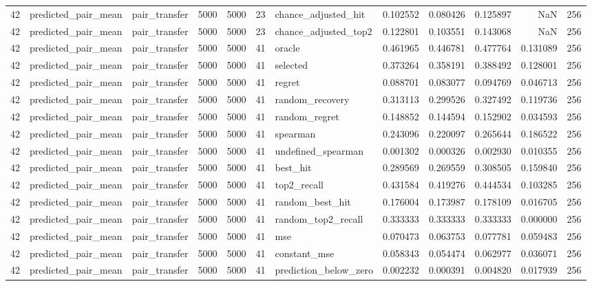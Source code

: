 \begin{tabular}{rllrrrlrrrrr}
42 & predicted_pair_mean & pair_transfer & 5000 & 5000 & 23 & chance_adjusted_hit & 0.102552 & 0.080426 & 0.125897 & NaN & 256 \\
42 & predicted_pair_mean & pair_transfer & 5000 & 5000 & 23 & chance_adjusted_top2 & 0.122801 & 0.103551 & 0.143068 & NaN & 256 \\
42 & predicted_pair_mean & pair_transfer & 5000 & 5000 & 41 & oracle & 0.461965 & 0.446781 & 0.477764 & 0.131089 & 256 \\
42 & predicted_pair_mean & pair_transfer & 5000 & 5000 & 41 & selected & 0.373264 & 0.358191 & 0.388492 & 0.128001 & 256 \\
42 & predicted_pair_mean & pair_transfer & 5000 & 5000 & 41 & regret & 0.088701 & 0.083077 & 0.094769 & 0.046713 & 256 \\
42 & predicted_pair_mean & pair_transfer & 5000 & 5000 & 41 & random_recovery & 0.313113 & 0.299526 & 0.327492 & 0.119736 & 256 \\
42 & predicted_pair_mean & pair_transfer & 5000 & 5000 & 41 & random_regret & 0.148852 & 0.144594 & 0.152902 & 0.034593 & 256 \\
42 & predicted_pair_mean & pair_transfer & 5000 & 5000 & 41 & spearman & 0.243096 & 0.220097 & 0.265644 & 0.186522 & 256 \\
42 & predicted_pair_mean & pair_transfer & 5000 & 5000 & 41 & undefined_spearman & 0.001302 & 0.000326 & 0.002930 & 0.010355 & 256 \\
42 & predicted_pair_mean & pair_transfer & 5000 & 5000 & 41 & best_hit & 0.289569 & 0.269559 & 0.308505 & 0.159840 & 256 \\
42 & predicted_pair_mean & pair_transfer & 5000 & 5000 & 41 & top2_recall & 0.431584 & 0.419276 & 0.444534 & 0.103285 & 256 \\
42 & predicted_pair_mean & pair_transfer & 5000 & 5000 & 41 & random_best_hit & 0.176004 & 0.173987 & 0.178109 & 0.016705 & 256 \\
42 & predicted_pair_mean & pair_transfer & 5000 & 5000 & 41 & random_top2_recall & 0.333333 & 0.333333 & 0.333333 & 0.000000 & 256 \\
42 & predicted_pair_mean & pair_transfer & 5000 & 5000 & 41 & mse & 0.070473 & 0.063753 & 0.077781 & 0.059483 & 256 \\
42 & predicted_pair_mean & pair_transfer & 5000 & 5000 & 41 & constant_mse & 0.058343 & 0.054474 & 0.062977 & 0.036071 & 256 \\
42 & predicted_pair_mean & pair_transfer & 5000 & 5000 & 41 & prediction_below_zero & 0.002232 & 0.000391 & 0.004820 & 0.017939 & 256 \\

\end{tabular}
